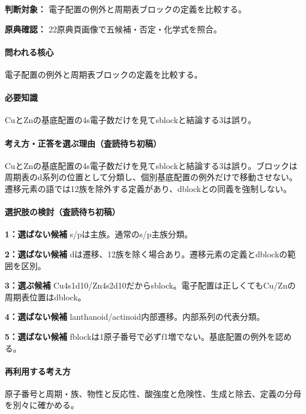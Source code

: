 \noindent\textbf{判断対象：} 電子配置の例外と周期表ブロックの定義を比較する。\par

\noindent\textbf{原典確認：} 22原典頁画像で五候補・否定・化学式を照合。\par

\paragraph{問われる核心} 電子配置の例外と周期表ブロックの定義を比較する。

\paragraph{必要知識} CuとZnの基底配置の4s電子数だけを見てsblockと結論する3は誤り。

\paragraph{考え方・正答を選ぶ理由（査読待ち初稿）} CuとZnの基底配置の4s電子数だけを見てsblockと結論する3は誤り。ブロックは周期表のd系列の位置として分類し、個別基底配置の例外だけで移動させない。遷移元素の語では12族を除外する定義があり、dblockとの同義を強制しない。

\paragraph{選択肢の検討（査読待ち初稿）}\mbox{}\par

\noindent\textbf{1：選ばない候補} s/pは主族。通常のs/p主族分類。\par

\noindent\textbf{2：選ばない候補} dは遷移、12族を除く場合あり。遷移元素の定義とdblockの範囲を区別。\par

\noindent\textbf{3：選ぶ候補} Cu4s1d10/Zn4s2d10だからsblock。電子配置は正しくてもCu/Znの周期表位置はdblock。\par

\noindent\textbf{4：選ばない候補} lanthanoid/actinoid内部遷移。内部系列の代表分類。\par

\noindent\textbf{5：選ばない候補} fblockは1原子番号で必ずf1増でない。基底配置の例外を認める。\par

\paragraph{再利用する考え方} 原子番号と周期・族、物性と反応性、酸強度と危険性、生成と除去、定義の分母を別々に確かめる。

